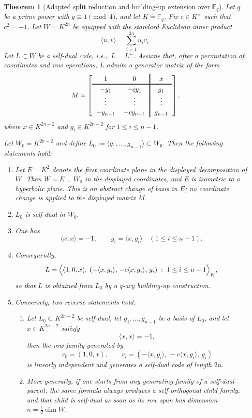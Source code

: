 \documentclass[12pt]{article}
\newtheorem{theorem}{Theorem}[section]
\newenvironment{blueblock}{\begingroup\color{blue}}{\endgroup}
\begin{document}
\begin{theorem}[Adapted split reduction and building-up extension over $\mathbb{F}_q$]\label{thm:qary-building-up}
Let $q$ be a prime power with $q \equiv 1 \pmod{4}$, and let $K=\mathbb{F}_q$.
Fix $c \in K^\times$ such that $c^2=-1$.
Let $W=K^{2n}$ be equipped with the standard Euclidean inner product
\[
\langle u,v\rangle = \sum_{i=1}^{2n} u_i v_i.
\]
Let $L \subset W$ be a self-dual code, i.e.,\ $L=L^\perp$. Assume that,
after a permutation of coordinates and row operations, \(L\) admits a
generator matrix of the form
\[
\begingroup
\setlength{\arraycolsep}{6pt}
\renewcommand{\arraystretch}{1.2}
M=
\left[
\begin{array}{cc!{\vrule width 1.2pt}c}
1 & 0 & x\\
\noalign{\hrule height 1.2pt}
-y_1 & -c y_1 & g_1\\
\vdots & \vdots & \vdots\\
-y_{n-1} & -c y_{n-1} & g_{n-1}
\end{array}
\right]
\endgroup,
\]
where $x \in K^{2n-2}$ and $g_i \in K^{2n-2}$ for $1 \le i \le n-1$.

Let $W_0 = K^{2n-2}$ and define $L_0 := \langle g_1,\dots,g_{n-1}\rangle \subset W_0$.
Then the following statements hold:
\begin{enumerate}
\item Let \(E=K^2\) denote the first coordinate plane in the displayed
decomposition of \(W\).
Then \(W=E\perp W_0\) in the displayed coordinates, and \(E\) is
isometric to a hyperbolic plane.  This is an abstract change of basis in
\(E\); no coordinate change is applied to the displayed matrix \(M\).
\item $L_0$ is self-dual in $W_0$.
\item One has
\[
\langle x,x\rangle=-1,
\qquad
y_i = \langle x, g_i\rangle\quad(1\le i\le n-1).
\]
\item Consequently,
\[
L = \Bigl\langle(1,0,x),\;
(-\langle x,g_i\rangle,\,-c\langle x,g_i\rangle,\,g_i)\;:\;1 \le i \le n-1\Bigr\rangle_K,
\]
so that $L$ is obtained from $L_0$ by a $q$-ary building-up construction.
\item Conversely, two reverse statements hold:
\begin{enumerate}[label=(5\alph*)]
\item Let $L_0 \subset K^{2n-2}$ be self-dual, let $g_1,\dots,g_{n-1}$ be a basis of $L_0$, and let $x \in K^{2n-2}$ satisfy
\[
\langle x,x\rangle = -1,
\]
then the row family generated by
\[
r_0 = (1,0,x), \qquad
r_i = (-\langle x,g_i\rangle,\,-c\langle x,g_i\rangle,\,g_i)
\]
is linearly independent and generates a self-dual code of length $2n$.
\item More generally, if one starts from any generating family of a self-dual parent, the same formula always produces a self-orthogonal child family, and that child is self-dual as soon as its row span has dimension $n=\frac12 \dim W$.
\end{enumerate}
\end{enumerate}
\end{theorem}
\end{document}
